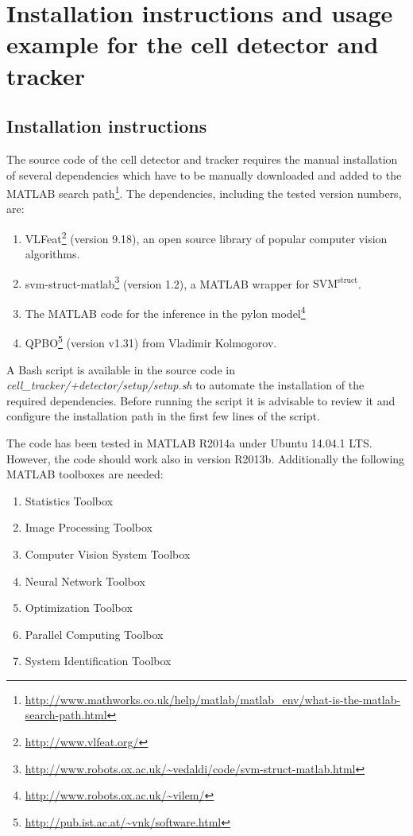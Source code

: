 \chapter{Installation instructions and usage example for the cell detector and tracker}
	\label{app:detectiontracking}
	
	\section{Installation instructions}
	The source code of the cell detector and tracker requires the manual installation of several dependencies which have to be manually downloaded and added to the MATLAB search path\footnote{\url{http://www.mathworks.co.uk/help/matlab/matlab_env/what-is-the-matlab-search-path.html}}. The dependencies, including the tested version numbers, are:
	
	\begin{enumerate}
	\item {VLFeat}\footnote{\url{http://www.vlfeat.org/}} (version 9.18), an open source library of popular computer vision algorithms.
	\item {svm-struct-matlab}\footnote{\url{http://www.robots.ox.ac.uk/\~vedaldi/code/svm-struct-matlab.html}} (version 1.2), a MATLAB wrapper for $\text{SVM}^\text{struct}$.
	\item The MATLAB code for the inference in the pylon model\footnote{\url{http://www.robots.ox.ac.uk/\~vilem/}}
	\item {QPBO}\footnote{\url{http://pub.ist.ac.at/\~vnk/software.html}} (version v1.31) from Vladimir Kolmogorov.
	\end{enumerate}
	
	A Bash script is available in the source code in \textit{cell\_tracker/+detector/setup/setup.sh} to automate the installation of the required dependencies. Before running the script it is advisable to review it and configure the installation path in the first few lines of the script.	
	
	The code has been tested in MATLAB R2014a under Ubuntu 14.04.1 LTS. However, the code should work also in version R2013b. Additionally the following MATLAB toolboxes are needed:
	
	\begin{enumerate}
	\item Statistics Toolbox
	\item Image Processing Toolbox
	\item Computer Vision System Toolbox
	\item Neural Network Toolbox
	\item Optimization Toolbox
	\item Parallel Computing Toolbox
	\item System Identification Toolbox
	\end{enumerate}
	
